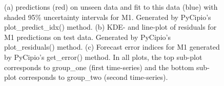 \documentclass{article}
\begin{document}
\begin{figure}[H]
    \centering
    \quad
    \quad
    \caption{(a) predictions (red) on unseen data and fit to this data (blue) with shaded 95\% uncertainty intervals for M1. Generated by PyCipio’s plot\_predict\_idx() method. (b) KDE- and line-plot of residuals for M1 predictions on test data. Generated by PyCipio's plot\_residuals() method. (c) Forecast error indices for M1 generated by PyCipio's get\_error() method. In all plots, the top sub-plot corresponds to group\_one (first time-series) and the bottom sub-plot corresponds to group\_two (second time-series).}
\end{figure}
\end{document}
